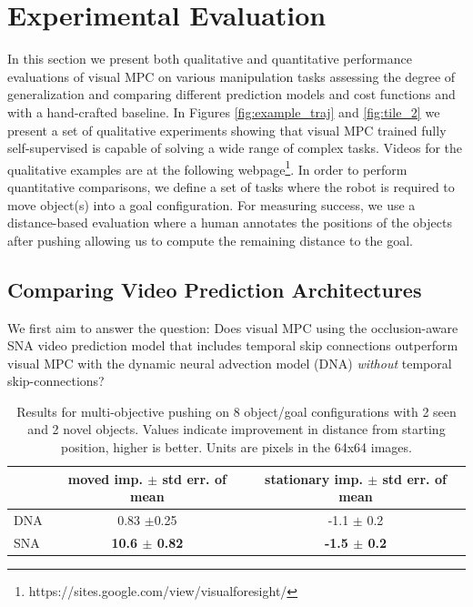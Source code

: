 \section{Experimental Evaluation}
\label{sec:experiments}
In this section we present both qualitative and quantitative  performance evaluations of visual MPC on various manipulation tasks assessing the degree of generalization and comparing different prediction models and cost functions and with a hand-crafted baseline.
In Figures \ref{fig:example_traj} and \ref{fig:tile_2} we present a set of qualitative experiments showing that visual MPC trained fully self-supervised is capable of solving a wide range of complex tasks.
Videos for the qualitative examples are at the following webpage\footnote{https://sites.google.com/view/visualforesight/}.
In order to perform quantitative comparisons, we define a set of tasks where the robot is required to move object(s) into a goal configuration. For measuring success, we use a distance-based evaluation where a human annotates the positions of the objects after pushing allowing us to compute the remaining distance to the goal.

\subsection{Comparing Video Prediction Architectures}
\label{subsec:sna_experiments}
We first aim to answer the question: Does  visual MPC using the occlusion-aware SNA video prediction model that includes temporal skip connections outperform visual MPC with the dynamic neural advection model (DNA)\cite{foresight} \emph{without} temporal skip-connections?

\begin{table}
\centering
{\footnotesize
\begin{tabular}{lcc}
	\toprule
         &  \thead{moved imp. \\ $\pm$ std err. of mean} &   \thead{stationary imp. \\ $\pm$ std err. of mean}  \\
         \midrule
  DNA \cite{foresight} & 0.83 $\pm$0.25 &  -1.1 $\pm$ 0.2\\ 
  SNA & \textbf{10.6 $\pm$ 0.82} & \textbf{-1.5 $\pm$ 0.2} \\
  \bottomrule
\end{tabular}
}
\caption{Results for multi-objective pushing on 8 object/goal configurations with 2 seen and 2 novel objects. Values indicate improvement in distance from starting position, higher is better. Units are pixels in the 64x64 images.} 
\label{table:mult_obj}
\end{table}

